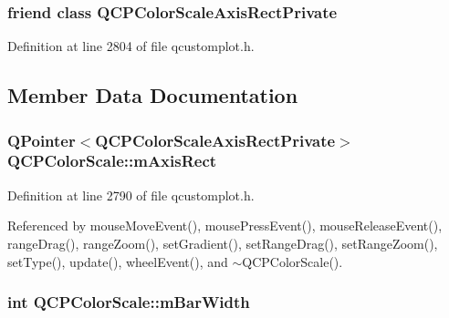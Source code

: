 \subsubsection[{Q\+C\+P\+Color\+Scale\+Axis\+Rect\+Private}]{\setlength{\rightskip}{0pt plus 5cm}friend class {\bf Q\+C\+P\+Color\+Scale\+Axis\+Rect\+Private}\hspace{0.3cm}{\ttfamily [friend]}}\label{class_q_c_p_color_scale_a1441d8c09d7227c0c29a8d0a96d55bfe}


Definition at line 2804 of file qcustomplot.\+h.



\subsection{Member Data Documentation}
\hypertarget{class_q_c_p_color_scale_a6e37f7d49cd614dc50ef1caae60461b9}{}
\subsubsection[{m\+Axis\+Rect}]{\setlength{\rightskip}{0pt plus 5cm}Q\+Pointer$<${\bf Q\+C\+P\+Color\+Scale\+Axis\+Rect\+Private}$>$ Q\+C\+P\+Color\+Scale\+::m\+Axis\+Rect\hspace{0.3cm}{\ttfamily [protected]}}\label{class_q_c_p_color_scale_a6e37f7d49cd614dc50ef1caae60461b9}


Definition at line 2790 of file qcustomplot.\+h.



Referenced by mouse\+Move\+Event(), mouse\+Press\+Event(), mouse\+Release\+Event(), range\+Drag(), range\+Zoom(), set\+Gradient(), set\+Range\+Drag(), set\+Range\+Zoom(), set\+Type(), update(), wheel\+Event(), and $\sim$\+Q\+C\+P\+Color\+Scale().

\hypertarget{class_q_c_p_color_scale_a409d2ab78dff1f92da5e6acfb062e811}{}
\subsubsection[{m\+Bar\+Width}]{\setlength{\rightskip}{0pt plus 5cm}int Q\+C\+P\+Color\+Scale\+::m\+Bar\+Width\hspace{0.3cm}{\ttfamily [protected]}}\label{class_q_c_p_color_scale_a409d2ab78dff1f92da5e6acfb062e811}



